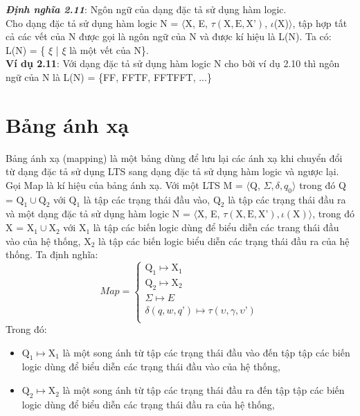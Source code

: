 \documentclass[a4paper,13pt,oneside,openany]{book}
\begin{document}
\begin{flushleft}
		\textbf{\textit{Định nghĩa 2.11}}: Ngôn ngữ của dạng đặc tả sử dụng hàm logic.\\
		Cho dạng đặc tả sử dụng hàm logic N = $\langle$X, E, $\tau(\textrm{X}, \textrm{E}, \textrm{X'})$, $\iota$(X)$\rangle$, tập hợp tất cả các vết của N được gọi là ngôn ngữ của N và được kí hiệu là L(N). Ta có: L(N) =  \{ $\xi$ | $\xi$ là một vết của N\}.\\
		\textbf{Ví dụ 2.11}: Với dạng đặc tả sử dụng hàm logic N cho bởi ví dụ 2.10 thì ngôn ngữ của N là L(N) = \{FF, FFTF, FFTFFT, ...\}
		\section{Bảng ánh xạ}
		Bảng ánh xạ (mapping) là một bảng dùng để lưu lại các ánh xạ khi chuyển đổi từ dạng đặc tả sử dụng LTS sang dạng đặc tả sử dụng hàm logic và ngược lại.\\
		Gọi Map là kí hiệu của bảng ánh xạ. Với một LTS M = $\langle$Q, $\Sigma, \delta, q_{0}\rangle$ trong đó Q = $\textrm{Q}_1 \cup \textrm{Q}_2$ với $\textrm{Q}_1$ là tập các trạng thái đầu vào, $\textrm{Q}_2$ là tập các trạng thái đầu ra và một dạng đặc tả sử dụng hàm logic N = $\langle$X, E, $\tau(\textrm{X}, \textrm{E}, \textrm{X'}), \iota(\textrm{X})\rangle$, trong đó X = $\textrm{X}_1 \cup \textrm{X}_2$ với $\textrm{X}_1$ là tập các biến logic dùng để biểu diễn các trang thái đầu vào của hệ thống, $\textrm{X}_2$ là tập các biến logic biểu diễn các trạng thái đầu ra của hệ thống. Ta định nghĩa:\\
		\[Map = \left\{
		\begin{array}{lr}
			\textrm{Q}_1 \mapsto \textrm{X}_1\\
			\textrm{Q}_2 \mapsto \textrm{X}_2\\
			\Sigma \mapsto E\\
			\delta(q, w, q\textrm{'}) \mapsto \tau(\upsilon, \gamma, \upsilon\textrm{'})\\
		\end{array}
		\right.
		\]
		Trong đó:\\
		\begin{itemize}
			\item $\textrm{Q}_1 \mapsto \textrm{X}_1$ là một song ánh từ tập các trạng thái đầu vào đến tập tập các biến logic dùng để biểu diễn các trạng thái đầu vào của hệ thống,
			\item $\textrm{Q}_2 \mapsto \textrm{X}_2$ là một song ánh từ tập các trạng thái đầu ra đến tập tập các biến logic dùng để biểu diễn các trạng thái đầu ra của hệ thống,

\end{itemize}
\end{flushleft}
\end{document}
